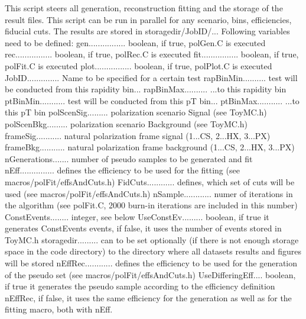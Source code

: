 \documentclass{article}
\begin{document}
This script steers all generation, reconstruction fitting and the storage of the result
files. This script can be run in parallel for any scenario, bins, efficiencies, fiducial
cuts. The results are stored in storagedir/JobID/...
Following variables need to be defined:
\newline gen................ boolean, if true, polGen.C is executed
\newline rec................ boolean, if true, polRec.C is executed
\newline fit................ boolean, if true, polFit.C is executed
\newline plot................ boolean, if true, polPlot.C is executed
\newline JobID.............. Name to be specified for a certain test
\newline rapBinMin.......... test will be conducted from this rapidity bin...
\newline rapBinMax.......... ...to this rapidity bin
\newline ptBinMin........... test will be conducted from this pT bin...
\newline ptBinMax........... ...to this pT bin
\newline polScenSig......... polarization scenario Signal (see ToyMC.h)
\newline polScenBkg......... polarization scenario Background (see ToyMC.h)
\newline frameSig........... natural polarization frame signal (1...CS, 2...HX, 3...PX)
\newline frameBkg........... natural polarization frame background (1...CS, 2...HX, 3...PX)
\newline nGenerations....... number of pseudo samples to be generated and fit
\newline nEff............... defines the efficiency to be used for the
fitting (see macros/polFit/effsAndCuts.h)
\newline FidCuts............ defines,
which set of cuts will be used (see macros/polFit/effsAndCuts.h)
\newline nSample............ numer of iterations in the algorithm (see polFit.C, 2000 burn-in iterations are included in this number)
\newline ConstEvents........ integer, see below
\newline UseConstEv......... boolean, if true it generates ConstEvents events, if false, it uses the number of events
stored in ToyMC.h
\newline storagedir......... can to be set optionally (if there is not enough storage space in the code directory) to the directory where all datasets results and figures will be stored
\newline nEffRec............ defines the efficiency to be used for the
generation of the pseudo set (see macros/polFit/effsAndCuts.h)
\newline UseDifferingEff.... boolean, if true it generates the pseudo sample
according to the efficiency definition nEffRec, if false, it uses the same
efficiency for the generation as well as for the fitting macro, both with nEff.
\end{document}
